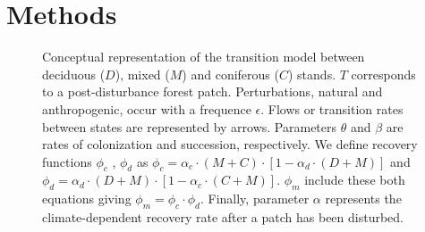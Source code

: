\section{Methods}   

\begin{figure}
	
	\caption{Conceptual representation of the transition model between deciduous ($D$),
	mixed ($M$) and coniferous ($C$) stands. $T$ corresponds to a post-disturbance forest patch. Perturbations, natural and anthropogenic, occur with a frequence $\epsilon$. 
	Flows or transition rates between states are represented by arrows.
	Parameters $\theta$ and $\beta$ are rates of colonization and succession,
	respectively. We define recovery functions $\phi_c$ , $\phi_d$ as $\phi_c
	= \alpha_c \cdot (M+C) \cdot [1- \alpha_d \cdot (D+M)]$ and $\phi_d =
	\alpha_d \cdot (D+M) \cdot [1- \alpha_c \cdot (C+M)]$. $\phi_m$ include these both equations giving $\phi_m = \phi_c \cdot \phi_d$. Finally, parameter $\alpha$ represents the climate-dependent recovery rate after a patch has been disturbed.}
	\label{Model}
	\vspace{-1em}
\end{figure}


%


